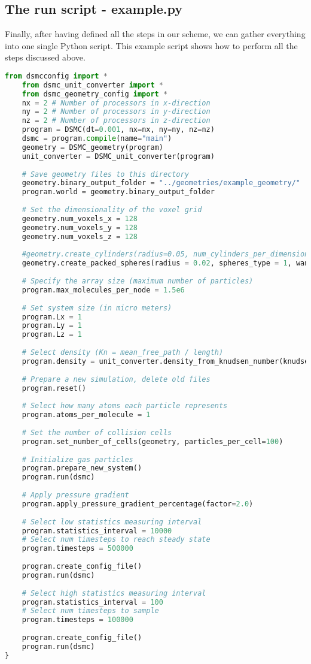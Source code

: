 \subsection{The run script - example.py}
Finally, after having defined all the steps in our scheme, we can gather everything into one single Python script. This example script shows how to perform all the steps discussed above. 
\begin{lstlisting}[caption=example.py, label=lst:dsmc_example_script, language=Python]
	from dsmcconfig import *
	from dsmc_unit_converter import *
	from dsmc_geometry_config import *
	nx = 2 # Number of processors in x-direction
	ny = 2 # Number of processors in y-direction
	nz = 2 # Number of processors in z-direction
	program = DSMC(dt=0.001, nx=nx, ny=ny, nz=nz)
	dsmc = program.compile(name="main")
	geometry = DSMC_geometry(program)
	unit_converter = DSMC_unit_converter(program)
	
	# Save geometry files to this directory
	geometry.binary_output_folder = "../geometries/example_geometry/"
	program.world = geometry.binary_output_folder
	
	# Set the dimensionality of the voxel grid
	geometry.num_voxels_x = 128
	geometry.num_voxels_y = 128
	geometry.num_voxels_z = 128
	
	#geometry.create_cylinders(radius=0.05, num_cylinders_per_dimension = 4)
	geometry.create_packed_spheres(radius = 0.02, spheres_type = 1, wanted_porosity = 0.5)
	
	# Specify the array size (maximum number of particles)
	program.max_molecules_per_node = 1.5e6
	
	# Set system size (in micro meters)
	program.Lx = 1
	program.Ly = 1
	program.Lz = 1
	
	# Select density (Kn = mean_free_path / length)
	program.density = unit_converter.density_from_knudsen_number(knudsen_number=1.0, length=program.Ly)
	
	# Prepare a new simulation, delete old files
	program.reset()
	
	# Select how many atoms each particle represents
	program.atoms_per_molecule = 1
	
	# Set the number of collision cells
	program.set_number_of_cells(geometry, particles_per_cell=100)
	
	# Initialize gas particles
	program.prepare_new_system()
	program.run(dsmc)
	
	# Apply pressure gradient
	program.apply_pressure_gradient_percentage(factor=2.0)
	
	# Select low statistics measuring interval
	program.statistics_interval = 10000
	# Select num timesteps to reach steady state
	program.timesteps = 500000
	
	program.create_config_file()
	program.run(dsmc)
	
	# Select high statistics measuring interval
	program.statistics_interval = 100
	# Select num timesteps to sample
	program.timesteps = 100000
	
	program.create_config_file()
	program.run(dsmc)
}
\end{lstlisting}
